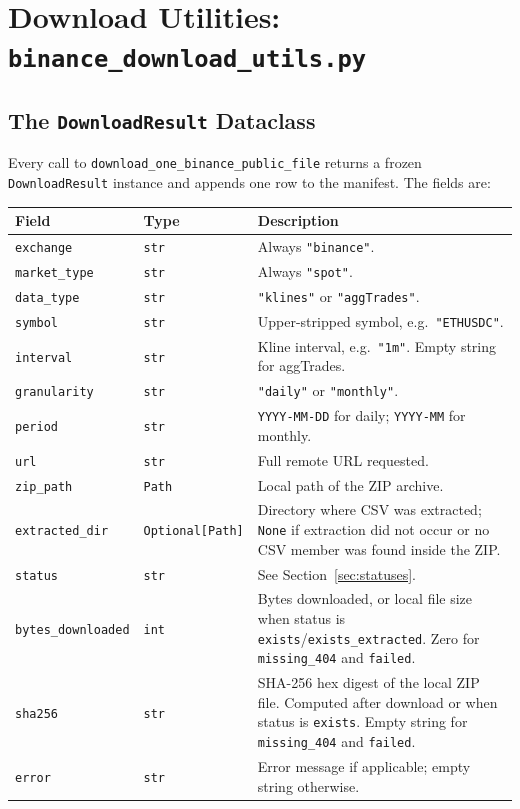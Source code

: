 \documentclass[11pt,a4paper]{article}
\begin{document}
\section{Download Utilities: \texttt{binance\_download\_utils.py}}
\label{sec:utils}

\subsection{The \texttt{DownloadResult} Dataclass}

Every call to \texttt{download\_one\_binance\_public\_file} returns a
frozen \texttt{DownloadResult} instance and appends one row to the
manifest. The fields are:

\begin{xltabular}{\linewidth}{L{3.8cm}L{2.6cm}Y}
\toprule
\textbf{Field} & \textbf{Type} & \textbf{Description} \\
\midrule
\texttt{exchange} & \texttt{str} &
  Always \texttt{"binance"}. \\
\texttt{market\_type} & \texttt{str} &
  Always \texttt{"spot"}. \\
\texttt{data\_type} & \texttt{str} &
  \texttt{"klines"} or \texttt{"aggTrades"}. \\
\texttt{symbol} & \texttt{str} &
  Upper-stripped symbol, e.g.\ \texttt{"ETHUSDC"}. \\
\texttt{interval} & \texttt{str} &
  Kline interval, e.g.\ \texttt{"1m"}. Empty string for aggTrades. \\
\texttt{granularity} & \texttt{str} &
  \texttt{"daily"} or \texttt{"monthly"}. \\
\texttt{period} & \texttt{str} &
  \texttt{YYYY-MM-DD} for daily; \texttt{YYYY-MM} for monthly. \\
\texttt{url} & \texttt{str} &
  Full remote URL requested. \\
\texttt{zip\_path} & \texttt{Path} &
  Local path of the ZIP archive. \\
\texttt{extracted\_dir} & \texttt{Optional[Path]} &
  Directory where CSV was extracted; \texttt{None} if extraction
  did not occur or no CSV member was found inside the ZIP. \\
\texttt{status} & \texttt{str} &
  See Section~\ref{sec:statuses}. \\
\texttt{bytes\_downloaded} & \texttt{int} &
  Bytes downloaded, or local file size when status is
  \texttt{exists}/\texttt{exists\_extracted}. Zero for
  \texttt{missing\_404} and \texttt{failed}. \\
\texttt{sha256} & \texttt{str} &
  SHA-256 hex digest of the local ZIP file. Computed after
  download or when status is \texttt{exists}. Empty string for
  \texttt{missing\_404} and \texttt{failed}. \\
\texttt{error} & \texttt{str} &
  Error message if applicable; empty string otherwise. \\
\bottomrule
\end{xltabular}
\end{document}
